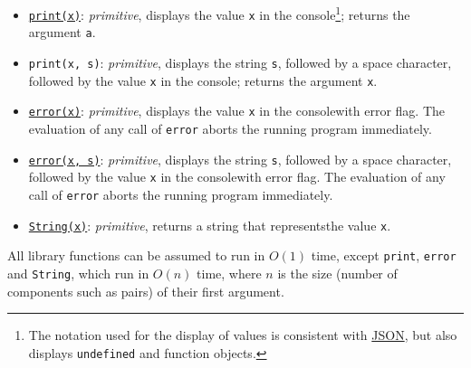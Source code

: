 \begin{itemize}
\item \href{https://sourceacademy.org/sicpjs/1.2.6\#footnote-7}{\texttt{print(x)}}: \textit{primitive}, displays the value \texttt{x} in the console\footnote{The notation used for the display of values is consistent with \href{http://www.ecma-international.org/publications/files/ECMA-ST/ECMA-404.pdf}{\color{DarkBlue}JSON}, but also displays \texttt{undefined} and function objects.}; returns the argument \texttt{a}.
\item \texttt{print(x, s)}: \textit{primitive}, displays the string \texttt{s}, followed by a space character, followed by the value \texttt{x} in the console\footnotemark[\value{footnote}]; returns the argument \texttt{x}.
\item \href{https://sourceacademy.org/sicpjs/1.2.6\#footnote-7}{\texttt{error(x)}}: \textit{primitive}, displays the value \texttt{x} in the console\footnotemark[\value{footnote}] with error flag. The evaluation
  of any call of \texttt{error} aborts the running program immediately.
\item \href{https://sourceacademy.org/sicpjs/2.1.3\#footnote-2}{\texttt{error(x, s)}}: \textit{primitive}, displays the string \texttt{s}, followed by a space character, followed by the value \texttt{x} in the console\footnotemark[\value{footnote}] with error flag. The evaluation
  of any call of \texttt{error} aborts the running program immediately.
\item \href{https://sourceacademy.org/sicpjs/3.3.4\#p24}{\lstinline{String(x)}}: \textit{primitive}, returns a string that represents\footnotemark[\value{footnote}] the value \texttt{x}. 
\end{itemize}
All library functions can be assumed to run
in $O(1)$ time, except \texttt{print}, \texttt{error} and \texttt{String}, 
which run in $O(n)$ time, where $n$ is
the size (number of components such as pairs) of their first argument.
